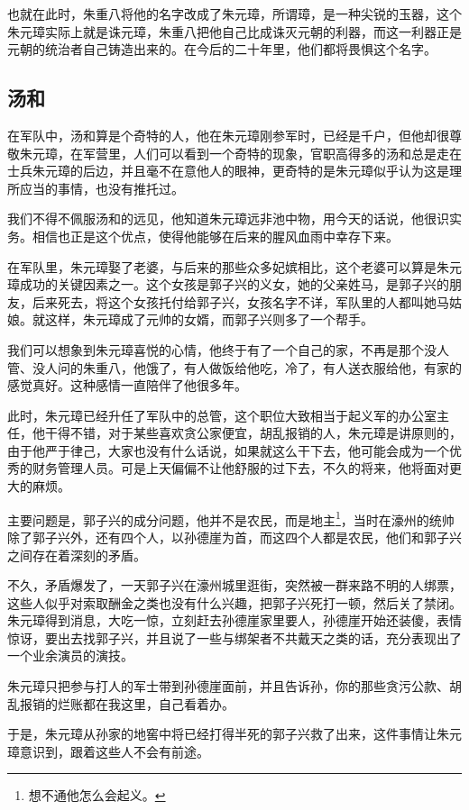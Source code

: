 \begin{multicols}{\theparacolNo}
		也就在此时，朱重八将他的名字改成了朱元璋，所谓璋，是一种尖锐的玉器，这个朱元璋实际上就是诛元璋，朱重八把他自己比成诛灭元朝的利器，而这一利器正是元朝的统治者自己铸造出来的。在今后的二十年里，他们都将畏惧这个名字。

		\subsection{汤和}
		在军队中，汤和算是个奇特的人，他在朱元璋刚参军时，已经是千户，但他却很尊敬朱元璋，在军营里，人们可以看到一个奇特的现象，官职高得多的汤和总是走在士兵朱元璋的后边，并且毫不在意他人的眼神，更奇特的是朱元璋似乎认为这是理所应当的事情，也没有推托过。

		我们不得不佩服汤和的远见，他知道朱元璋远非池中物，用今天的话说，他很识实务。相信也正是这个优点，使得他能够在后来的腥风血雨中幸存下来。

		在军队里，朱元璋娶了老婆，与后来的那些众多妃嫔相比，这个老婆可以算是朱元璋成功的关键因素之一。这个女孩是郭子兴的义女，她的父亲姓马，是郭子兴的朋友，后来死去，将这个女孩托付给郭子兴，女孩名字不详，军队里的人都叫她马姑娘。就这样，朱元璋成了元帅的女婿，而郭子兴则多了一个帮手。

		我们可以想象到朱元璋喜悦的心情，他终于有了一个自己的家，不再是那个没人管、没人问的朱重八，他饿了，有人做饭给他吃，冷了，有人送衣服给他，有家的感觉真好。这种感情一直陪伴了他很多年。

		此时，朱元璋已经升任了军队中的总管，这个职位大致相当于起义军的办公室主任，他干得不错，对于某些喜欢贪公家便宜，胡乱报销的人，朱元璋是讲原则的，由于他严于律己，大家也没有什么话说，如果就这么干下去，他可能会成为一个优秀的财务管理人员。可是上天偏偏不让他舒服的过下去，不久的将来，他将面对更大的麻烦。

		主要问题是，郭子兴的成分问题，他并不是农民，而是地主\footnote{想不通他怎么会起义。}，当时在濠州的统帅除了郭子兴外，还有四个人，以孙德崖为首，而这四个人都是农民，他们和郭子兴之间存在着深刻的矛盾。

		不久，矛盾爆发了，一天郭子兴在濠州城里逛街，突然被一群来路不明的人绑票，这些人似乎对索取酬金之类也没有什么兴趣，把郭子兴死打一顿，然后关了禁闭。朱元璋得到消息，大吃一惊，立刻赶去孙德崖家里要人，孙德崖开始还装傻，表情惊讶，要出去找郭子兴，并且说了一些与绑架者不共戴天之类的话，充分表现出了一个业余演员的演技。

		朱元璋只把参与打人的军士带到孙德崖面前，并且告诉孙，你的那些贪污公款、胡乱报销的烂账都在我这里，自己看着办。

		于是，朱元璋从孙家的地窖中将已经打得半死的郭子兴救了出来，这件事情让朱元璋意识到，跟着这些人不会有前途。


\end{multicols}
